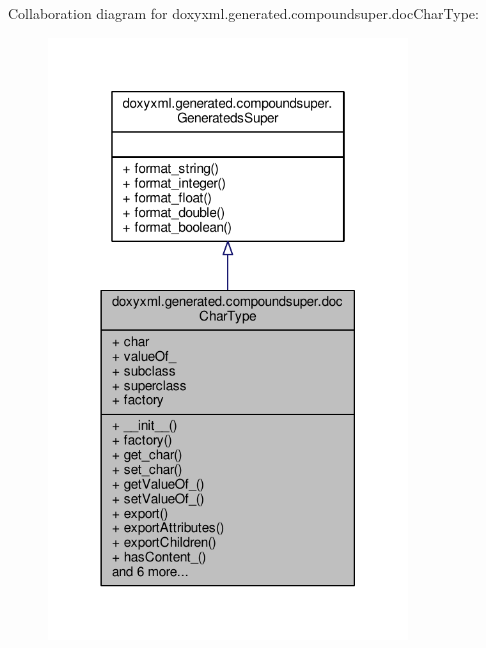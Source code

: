 Collaboration diagram for doxyxml.\+generated.\+compoundsuper.\+doc\+Char\+Type\+:
\nopagebreak
\begin{figure}[H]
\begin{center}
\leavevmode
\includegraphics[width=270pt]{d1/d83/classdoxyxml_1_1generated_1_1compoundsuper_1_1docCharType__coll__graph}
\end{center}
\end{figure}
